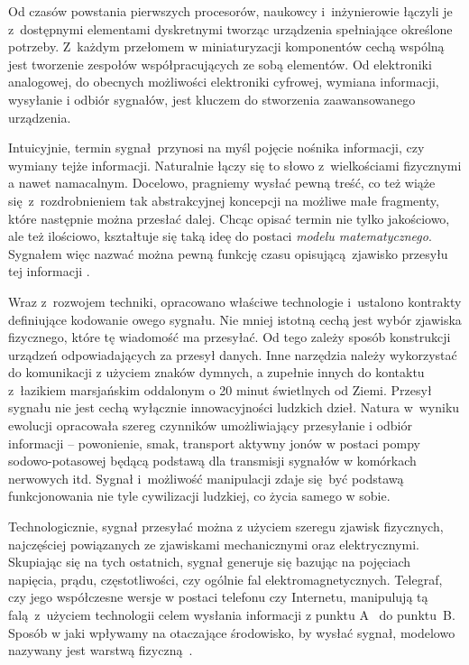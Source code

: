 Od czasów powstania pierwszych procesorów, naukowcy i~inżynierowie łączyli
je z~dostępnymi elementami dyskretnymi tworząc urządzenia spełniające
określone potrzeby. Z~każdym przełomem w miniaturyzacji komponentów
cechą wspólną jest tworzenie zespołów współpracujących ze sobą elementów.
Od elektroniki analogowej, do obecnych możliwości elektroniki cyfrowej,
wymiana informacji, wysyłanie i odbiór sygnałów, jest kluczem do 
stworzenia zaawansowanego urządzenia.

Intuicyjnie, termin sygnał przynosi na myśl pojęcie nośnika informacji, czy wymiany tejże informacji.
Naturalnie łączy się to słowo z~wielkościami fizycznymi a nawet namacalnym. Docelowo, pragniemy wysłać
pewną treść, co też wiąże się z~rozdrobnieniem tak abstrakcyjnej koncepcji na możliwe małe fragmenty,
które następnie można przesłać dalej. Chcąc opisać termin nie tylko jakościowo, ale też ilościowo,
kształtuje się taką ideę do postaci \textit{modelu matematycznego}. Sygnałem więc nazwać można pewną funkcję
czasu opisującą zjawisko przesyłu tej informacji \cite{szabatin_podstawy_2007}.

Wraz z~rozwojem techniki, opracowano właściwe technologie i~ustalono kontrakty definiujące kodowanie
owego sygnału. Nie mniej istotną cechą jest wybór zjawiska fizycznego, które tę wiadomość ma przesyłać.
Od tego zależy sposób konstrukcji urządzeń odpowiadających za przesył danych. Inne narzędzia
należy wykorzystać do komunikacji z użyciem znaków dymnych, a zupełnie innych do kontaktu
z~łazikiem marsjańskim oddalonym o 20 minut świetlnych od Ziemi. Przesył sygnału nie jest cechą
wyłącznie innowacyjności ludzkich dzieł. Natura w~wyniku ewolucji opracowała szereg
czynników umożliwiający przesyłanie i odbiór informacji -- powonienie, smak, transport aktywny jonów
w postaci pompy sodowo-potasowej będącą podstawą dla transmisji sygnałów w komórkach nerwowych itd.
Sygnał i~możliwość manipulacji zdaje się być podstawą funkcjonowania nie tyle cywilizacji ludzkiej,
co życia samego w sobie.

Technologicznie, sygnał przesyłać można z użyciem szeregu zjawisk fizycznych, najczęściej powiązanych 
ze zjawiskami mechanicznymi oraz elektrycznymi. Skupiając się na tych ostatnich, sygnał generuje się
bazując na pojęciach napięcia, prądu, częstotliwości, czy ogólnie fal elektromagnetycznych.
Telegraf, czy jego współczesne wersje w postaci telefonu czy Internetu, manipulują tą falą z~użyciem
technologii celem wysłania informacji z punktu A~ do punktu~B. Sposób w jaki wpływamy
na otaczające środowisko, by wysłać sygnał, modelowo nazywany jest warstwą fizyczną~\cite{sa_tcpip_nodate}.

